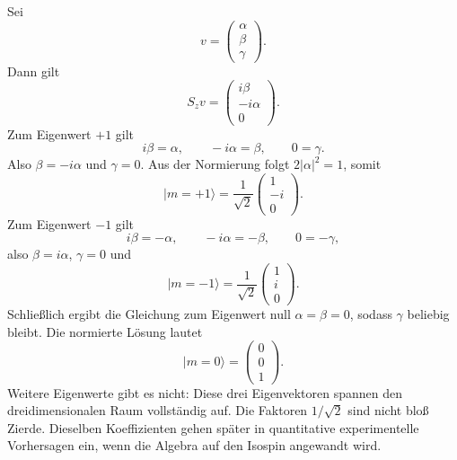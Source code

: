 Sei
\begin{equation}
v=
\begin{pmatrix}
\alpha\\
\beta\\
\gamma
\end{pmatrix}.
\end{equation}
Dann gilt
\begin{equation}
S_zv
=
\begin{pmatrix}
i\beta\\
-i\alpha\\
0
\end{pmatrix}.
\end{equation}
Zum Eigenwert \(+1\) gilt
\begin{equation}
i\beta=\alpha,
\qquad
-i\alpha=\beta,
\qquad
0=\gamma.
\end{equation}
Also \(\beta=-i\alpha\) und \(\gamma=0\). Aus der Normierung folgt \(2|\alpha|^2=1\), somit
\begin{equation}
|m=+1\rangle
=
\frac{1}{\sqrt2}
\begin{pmatrix}
1\\
-i\\
0
\end{pmatrix}.
\end{equation}
Zum Eigenwert \(-1\) gilt
\begin{equation}
i\beta=-\alpha,
\qquad
-i\alpha=-\beta,
\qquad
0=-\gamma,
\end{equation}
also \(\beta=i\alpha\), \(\gamma=0\) und
\begin{equation}
|m=-1\rangle
=
\frac{1}{\sqrt2}
\begin{pmatrix}
1\\
i\\
0
\end{pmatrix}.
\end{equation}
Schließlich ergibt die Gleichung zum Eigenwert null \(\alpha=\beta=0\), sodass \(\gamma\) beliebig bleibt. Die normierte Lösung lautet
\begin{equation}
|m=0\rangle
=
\begin{pmatrix}
0\\
0\\
1
\end{pmatrix}.
\end{equation}
Weitere Eigenwerte gibt es nicht: Diese drei Eigenvektoren spannen den dreidimensionalen Raum vollständig auf. Die Faktoren \(1/\sqrt2\) sind nicht bloß Zierde. Dieselben Koeffizienten gehen später in quantitative experimentelle Vorhersagen ein, wenn die Algebra auf den Isospin angewandt wird.

